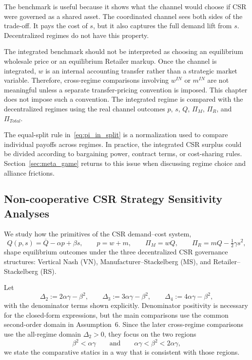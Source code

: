 The benchmark is useful because it shows what the channel would choose if CSR were governed as a shared asset. The coordinated channel sees both sides of the trade-off. It pays the cost of $s$, but it also captures the full demand lift from $s$. Decentralized regimes do not have this property.

The integrated benchmark should not be interpreted as choosing an equilibrium wholesale price or an equilibrium Retailer markup. Once the channel is integrated, $w$ is an internal accounting transfer rather than a strategic market variable. Therefore, cross-regime comparisons involving $w^{IN}$ or $m^{IN}$ are not meaningful unless a separate transfer-pricing convention is imposed. This chapter does not impose such a convention. The integrated regime is compared with the decentralized regimes using the real channel outcomes $p$, $s$, $Q$, $\Pi_M$, $\Pi_R$, and $\Pi_{Total}$.

The equal-split rule in~\eqref{eq:pi_in_split} is a normalization used to compare individual payoffs across regimes. In practice, the integrated CSR surplus could be divided according to bargaining power, contract terms, or cost-sharing rules. Section~\ref{sec:meta_game} returns to this issue when discussing regime choice and alliance frictions.

\subsection{Non-cooperative CSR Strategy Sensitivity Analyses}
\label{sec:sensitivity}

We study how the primitives of the CSR demand--cost system,
\[
Q(p,s)=\overline Q-\alpha p+\beta s,\qquad
p=w+m,\qquad
\Pi_M=wQ,\qquad
\Pi_R=mQ-\tfrac12\gamma s^2,
\]
shape equilibrium outcomes under the three decentralized CSR governance structures:
Vertical Nash (VN), Manufacturer--Stackelberg (MS), and Retailer--Stackelberg (RS).

Let
\[
\Delta_2:=2\alpha\gamma-\beta^2,\qquad
\Delta_3:=3\alpha\gamma-\beta^2,\qquad
\Delta_4:=4\alpha\gamma-\beta^2,
\]
with the denominator terms shown explicitly. Denominator positivity is necessary for the closed-form expressions, but the main comparisons use the common second-order domain in Assumption~6. Since the later cross-regime comparisons use the all-regime domain \(\Delta_2>0\), they focus on the two regions
\[
\beta^2<\alpha\gamma
\qquad\text{and}\qquad
\alpha\gamma<\beta^2<2\alpha\gamma,
\]
we state the comparative statics in a way that is consistent with those regions.

